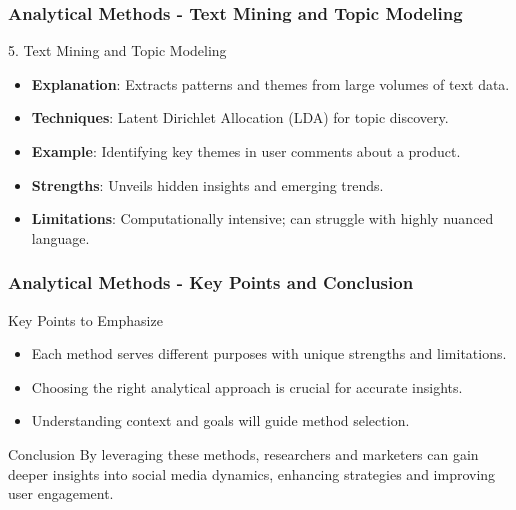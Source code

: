 \documentclass{beamer}
\begin{document}
\begin{frame}[fragile]
    \frametitle{Analytical Methods - Text Mining and Topic Modeling}
    \begin{block}{5. Text Mining and Topic Modeling}
        \begin{itemize}
            \item \textbf{Explanation}: Extracts patterns and themes from large volumes of text data.
            \item \textbf{Techniques}: Latent Dirichlet Allocation (LDA) for topic discovery.
            \item \textbf{Example}: Identifying key themes in user comments about a product.
            \item \textbf{Strengths}: Unveils hidden insights and emerging trends.
            \item \textbf{Limitations}: Computationally intensive; can struggle with highly nuanced language.
        \end{itemize}
    \end{block}
\end{frame}

\begin{frame}[fragile]
    \frametitle{Analytical Methods - Key Points and Conclusion}
    \begin{block}{Key Points to Emphasize}
        \begin{itemize}
            \item Each method serves different purposes with unique strengths and limitations.
            \item Choosing the right analytical approach is crucial for accurate insights.
            \item Understanding context and goals will guide method selection.
        \end{itemize}
    \end{block}

    \begin{block}{Conclusion}
        By leveraging these methods, researchers and marketers can gain deeper insights into social media dynamics, enhancing strategies and improving user engagement.
    \end{block}
\end{frame}
\end{document}
